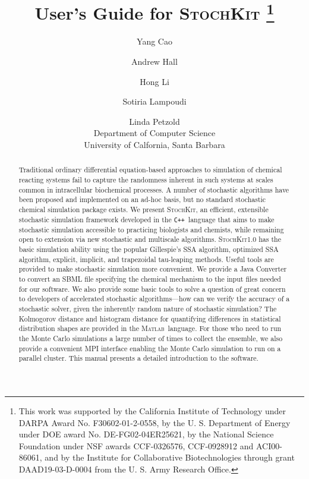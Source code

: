 \documentclass[12pt]{article}
\newcommand{\matlab}{\textsc{Matlab}}
\newcommand{\cpp}{\texttt{C++}}%
\newcommand{\sspack}{\textsc{StochKit}}
\begin{document}
\title{User's Guide for \sspack
\thanks{This work was supported by the California Institute of Technology
under DARPA Award No. F30602-01-2-0558,  by the U. S. Department of Energy
under DOE award No. DE-FG02-04ER25621, by the National Science Foundation
under NSF awards CCF-0326576, CCF-0928912 and ACI00-86061, and by the Institute for
Collaborative
Biotechnologies through grant DAAD19-03-D-0004 from the U. S. Army Research Office.
}
}
\author{ {Yang Cao} \and {Andrew Hall} \and {Hong Li} \and Sotiria Lampoudi \and {Linda Petzold} \\
Department of Computer Science \\ University of Calfornia, Santa Barbara
}

\date{}
\maketitle
\begin{abstract}
Traditional ordinary differential equation-based approaches to
simulation of chemical reacting systems fail to capture the
randomness inherent in such systems at scales common in
intracellular biochemical processes.  A number of stochastic
algorithms have been proposed and implemented on an ad-hoc basis,
but no standard stochastic chemical simulation package exists. We
present \sspack, an efficient, extensible stochastic simulation
framework developed in the \cpp\ language that aims to make
stochastic simulation accessible to practicing biologists and
chemists, while remaining open to extension via new stochastic and
multiscale algorithms. \sspack 1.0 has the basic simulation
ability using the popular Gillespie's SSA algorithm, optimized
SSA algorithm, explicit, implicit, and
trapezoidal tau-leaping methods. Useful tools are provided to make stochastic
simulation more convenient. We provide a Java Converter to convert
an SBML file specifying the chemical mechanism to the input files
needed for our software. We also provide some basic tools to solve
a question of great concern to developers of accelerated
stochastic algorithms---how can we verify the accuracy of a
stochastic solver, given the inherently random nature of
stochastic simulation? The Kolmogorov distance and histogram
distance for quantifying differences in statistical distribution
shapes are provided in the \matlab\ language. For those who need
to run the Monte Carlo simulations a large number of times to
collect the ensemble, we also provide a convenient MPI interface
enabling the Monte Carlo simulation to run on a parallel cluster.
This manual presents a detailed introduction to the software.
\end{abstract}
\end{document}
